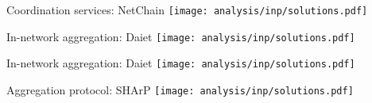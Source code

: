 \begin{frame}{Coordination services: NetChain}
    \centering
    \texttt{[image: analysis/inp/solutions.pdf]}
\end{frame}

\begin{frame}{In-network aggregation: Daiet}
    \centering
    \texttt{[image: analysis/inp/solutions.pdf]}
\end{frame}

\begin{frame}{In-network aggregation: Daiet}
    \centering
    \texttt{[image: analysis/inp/solutions.pdf]}
\end{frame}

\begin{frame}{Aggregation protocol: SHArP}
    \centering
    \texttt{[image: analysis/inp/solutions.pdf]}
\end{frame}

